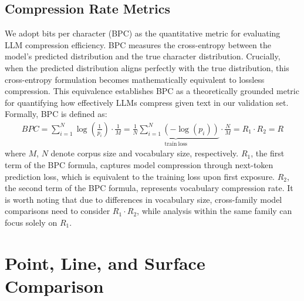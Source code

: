 \documentclass{article}
\begin{document}
\subsection{Compression Rate Metrics}
We adopt bits per character (BPC) as the quantitative metric for evaluating LLM compression efficiency. BPC measures the cross-entropy between the model's predicted distribution and the true character distribution. Crucially, when the predicted distribution aligns perfectly with the true distribution, this cross-entropy formulation becomes mathematically equivalent to lossless compression. This equivalence establishes BPC as a theoretically grounded metric for quantifying how effectively LLMs compress given text in our validation set. Formally, BPC is defined as:
\begin{equation}
\begin{aligned}
BPC = \sum_{i=1}^N \log\left(\frac{1}{p_i}\right) \cdot \frac{1}{M} 
= \underbrace{\frac{1}{N} \sum_{i=1}^N \left(-\log(p_i)\right)}_{\mathrm{train ~ loss}} \cdot \frac{N}{M}
= R_1 \cdot R_2 = R
\end{aligned}
\end{equation}
where $M$, $N$ denote corpus size and vocabulary size, respectively. $R_1$, the first term of the BPC formula, captures model compression through next-token prediction loss, which is equivalent to the training loss upon first exposure. $R_2$, the second term of the BPC formula, represents vocabulary compression rate. It is worth noting that due to differences in vocabulary size, cross-family model comparisons need to consider $R_1 \cdot R_2$, while analysis within the same family can focus solely on $R_1$.


\FloatBarrier

\section{Point, Line, and Surface Comparison}
\label{app:pls_comparison}
\end{document}
